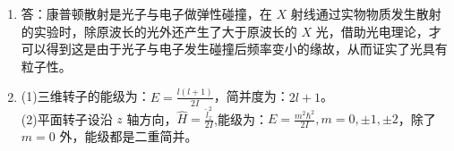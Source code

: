 \begin{enumerate}
\item
答：康普顿散射是光子与电子做弹性碰撞，在 $X$ 射线通过实物物质发生散射的实验时，除原波长的光外还产生了大于原波长的 $X$ 光，借助光电理论，才可以得到这是由于光子与电子发生碰撞后频率变小的缘故，从而证实了光具有粒子性。

\item 
(1)三维转子的能级为：$\displaystyle E = \frac{l(l+1)}{2I}$，简并度为：$2l+1$。\\
(2)平面转子设沿 $z$ 轴方向，$\displaystyle \hat{H} = \frac{\hat{l}^{2}_{z}}{2I}$,能级为：$\displaystyle E = \frac{m^{2} \hbar^{2}}{2I} ,m = 0 , \pm 1 , \pm 2$，除了 $m = 0$ 外，能级都是二重简并。
\end{enumerate}
\subsection{ }
